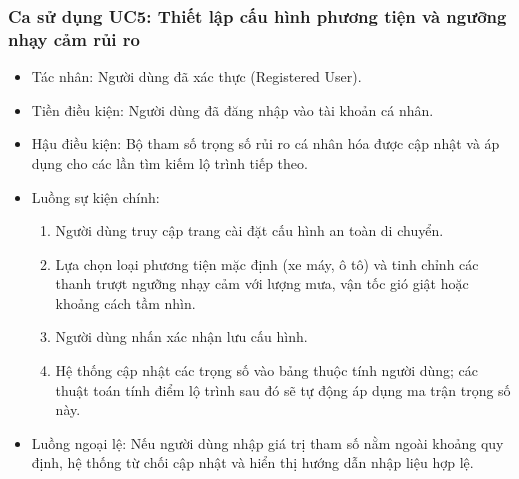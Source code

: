 \subsubsection{Ca sử dụng UC5: Thiết lập cấu hình phương tiện và ngưỡng nhạy cảm rủi ro}
\begin{itemize}
    \item Tác nhân: Người dùng đã xác thực (Registered User).
    \item Tiền điều kiện: Người dùng đã đăng nhập vào tài khoản cá nhân.
    \item Hậu điều kiện: Bộ tham số trọng số rủi ro cá nhân hóa được cập nhật và áp dụng cho các lần tìm kiếm lộ trình tiếp theo.
    \item Luồng sự kiện chính:
    \begin{enumerate}
        \item Người dùng truy cập trang cài đặt cấu hình an toàn di chuyển.
        \item Lựa chọn loại phương tiện mặc định (xe máy, ô tô) và tinh chỉnh các thanh trượt ngưỡng nhạy cảm với lượng mưa, vận tốc gió giật hoặc khoảng cách tầm nhìn.
        \item Người dùng nhấn xác nhận lưu cấu hình.
        \item Hệ thống cập nhật các trọng số vào bảng thuộc tính người dùng; các thuật toán tính điểm lộ trình sau đó sẽ tự động áp dụng ma trận trọng số này.
    \end{enumerate}
    \item Luồng ngoại lệ: Nếu người dùng nhập giá trị tham số nằm ngoài khoảng quy định, hệ thống từ chối cập nhật và hiển thị hướng dẫn nhập liệu hợp lệ.
\end{itemize}

